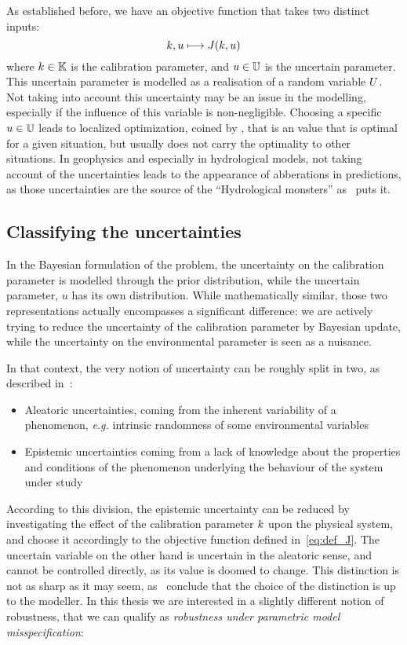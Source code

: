 \documentclass[../../Main_ManuscritThese.tex]{subfiles}
\begin{document}
As established before, we have an objective function that takes two distinct inputs:
\begin{equation}
  \label{eq:def_J}
  k, u \longmapsto J(k,u)
\end{equation}
where $k\in \mathbb{K}$ is the calibration parameter, and $u \in \mathbb{U}$ is the uncertain parameter. This uncertain parameter is modelled as a realisation of a random variable $U$.
Not taking into account this uncertainty may be an issue in the modelling, especially if the influence of this variable is non-negligible.
Choosing a specific $u \in \mathbb{U}$ leads to localized optimization, coined by , that is an value that is optimal for a given situation, but usually does not carry the optimality to other situations. 
In geophysics and especially in hydrological models, not taking account of the uncertainties leads to the appearance of abberations in predictions, as those uncertainties are the source of the ``Hydrological monsters'' as~\cite{kuczera_there_2010} puts it. \cite{andreassian_all_2012}

\subsection{Classifying the uncertainties}
In the Bayesian formulation of the problem, the uncertainty on the calibration parameter is modelled through the prior distribution, while the uncertain parameter, $u$ has its own distribution. While mathematically similar, those two representations actually encompasses a significant difference: we are actively trying to reduce the uncertainty of the calibration parameter by Bayesian update, while the uncertainty on the environmental parameter is seen as a nuisance.

In that context, the very notion of uncertainty can be roughly split in two, as described in~\cite{walker_defining_2003}:
\begin{itemize}
\item Aleatoric uncertainties, coming from the inherent variability of a phenomenon, \emph{e.g.} intrinsic randomness of some environmental variables
\item Epistemic uncertainties coming from a lack of knowledge about the properties and conditions of the phenomenon underlying the behaviour of the system under study
\end{itemize}
According to this division,  the epistemic uncertainty can be reduced by investigating the effect of the calibration parameter $k$ upon the physical system, and choose it accordingly to the objective function defined in~\cref{eq:def_J}.
The uncertain variable on the other hand is uncertain in the aleatoric sense, and cannot be controlled directly, as its value is doomed to change. This distinction is not as sharp as it may seem, as~\cite{kiureghian_aleatory_2009} conclude that the choice of the distinction is up to the modeller.
In this thesis we are interested in a slightly different notion of robustness, that we can qualify as \emph{robustness under parametric model misspecification}:
\end{document}
